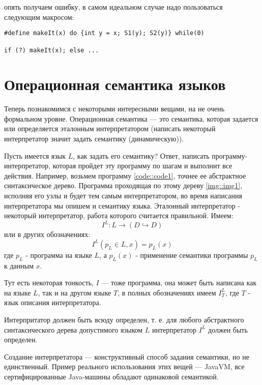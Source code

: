 опять получаем ошибку, в самом идеальном случае надо пользоваться следующим макросом:

\begin{lstlisting}
#define makeIt(x) do {int y = x; S1(y); S2(y)} while(0)

if (?) makeIt(x); else ...
\end{lstlisting}

\section{Операционная семантика языков}

Теперь познакомимся с некоторыми интересными вещами, на не очень формальном уровне. Операционная семантика --- это семантика, которая задается или определяется
эталонным интерпретатором (написать некоторый интерпретатор значит задать семантику (динамическую)).

Пусть имеется язык $L$, как задать его семантику? Ответ, написать программу-интерпретатор, которая пройдет эту программу по шагам и выполнит все действия.
Например, возьмем программу \ref{code::code1}, точнее ее абстрактное синтаксическое дерево. Программа проходящая по этому дереву \ref{img::img1},
исполняя его узлы и будет тем самым интерпретатором, во время написания интерпретатора мы опишем и семантику языка. Эталонный интерпретатор - некоторый
интерпретатор, работа которого считается правильной. Имеем: $$ I^L : L \rightarrow \left(D \hookrightarrow D\right) $$ или в других обозначениях:
$$ I^L \left(p_L \in L, x\right) = p_L\left(x\right) $$
где $p_L$ - программа на языке $L$, а $p_L(x)$ - применение семантики программы $p_L$ к данным $x$.

Тут есть некоторая тонкость, $I$ --- тоже программа, она может быть написана как на языке $L$, так и на другом языке $T$, в полных обозначениях имеем $I^L_T$, где
$T$ - язык описания интерпретатора.

Интерпритатор должен быть всюду определен, т. е. для любого абстрактного синтаксического дерева допустимого языком $L$ интерпретатор $I^L$ должен быть определен.

Создание интерпретатора --- конструктивный способ задания семантики, но не единственный. Пример реального использования этих вещей --- JavaVM, все сертифицированные
Java-машины обладают одинаковой семантикой.

